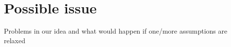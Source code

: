 \section{Possible issue}
Problems in our idea and what would happen if one/more assumptions are relaxed